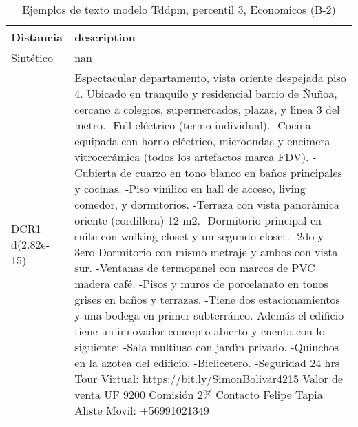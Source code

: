 \begin{table}[H]
\centering
\fontsize{10}{14}\selectfont
\caption{Ejemplos de texto modelo Tddpm, percentil 3, Economicos (B-2)}
\label{table-example-economicos-b-2-tddpm_mlp-3p-text}
\begin{tabular}{|l|m{35em}|}
\hline
\rowcolor[gray]{0.8}
Distancia & description \\
\hline Sintético & nan \\
\hline DCR1 d(2.82e-15) & Espectacular departamento, vista oriente despejada piso 4.
Ubicado en tranquilo y residencial barrio de \~Nu\~noa, cercano a colegios, supermercados, plazas, y l{\'\i}nea 3 del metro.
-Full el\'ectrico (termo individual).
-Cocina equipada con horno el\'ectrico, microondas y encimera vitrocer\'amica (todos los artefactos marca FDV).
-Cubierta de cuarzo en tono blanco en ba\~nos principales y cocinas.
-Piso vin{\'\i}lico en hall de acceso, living comedor, y dormitorios.
-Terraza con vista panor\'amica oriente (cordillera) 12 m2.
-Dormitorio principal en suite con walking closet y un segundo closet.
-2do y 3ero Dormitorio con mismo metraje y ambos con vista sur.
-Ventanas de termopanel con marcos de PVC madera caf\'e.
-Pisos y muros de porcelanato en tonos grises en ba\~nos y terrazas.
-Tiene dos estacionamientos y una bodega en primer subterr\'aneo.
Adem\'as el edificio tiene un innovador concepto abierto y cuenta con lo siguiente:
-Sala multiuso con jard{\'\i}n privado.
-Quinchos en la azotea del edificio.
-Biclicetero.
-Seguridad 24 hrs
Tour Virtual: https://bit.ly/SimonBolivar4215
Valor de venta UF 9200
Comisi\'on 2\%
Contacto
Felipe Tapia Aliste
Movil: +56991021349 \\

\end{tabular}
\end{table}

